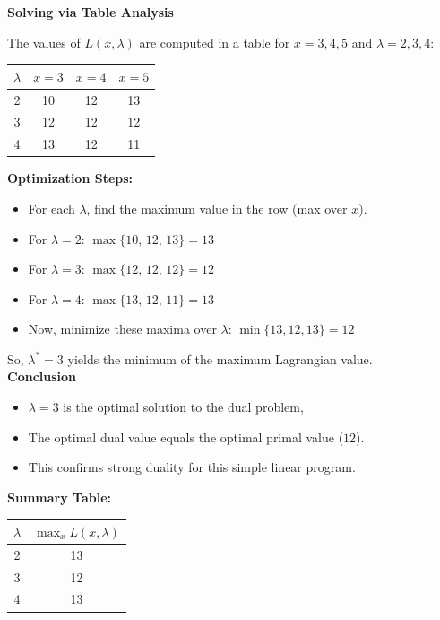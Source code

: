 \documentclass[12pt]{article}
\begin{document}
\textbf{Solving via Table Analysis}

The values of $L(x, \lambda)$ are computed in a table for $x = 3, 4, 5$ and $\lambda = 2, 3, 4$:

\begin{center}
\begin{tabular}{c|ccc}
$\lambda$ & $x = 3$ & $x = 4$ & $x = 5$ \\
\hline
2 & 10 & 12 & 13 \\
3 & 12 & 12 & 12 \\
4 & 13 & 12 & 11 \\
\end{tabular}
\end{center}

\vspace{1em}
\textbf{Optimization Steps:}
\begin{itemize}
    \item For each $\lambda$, find the maximum value in the row (max over $x$).
    \item For $\lambda = 2$: $\max \{10, \, 12, \, 13\} = 13$
    \item For $\lambda = 3$: $\max \{12, \, 12, \, 12\} = 12$
    \item For $\lambda = 4$: $\max \{13, \, 12, \, 11\} = 13$
    \item Now, minimize these maxima over $\lambda$: $\min \{13, 12, 13\} = 12$
\end{itemize}
So, $\lambda^* = 3$ yields the minimum of the maximum Lagrangian value. \\ 

\textbf{Conclusion}

\begin{itemize}
    \item $\lambda = 3$ is the optimal solution to the dual problem,
    \item The optimal dual value equals the optimal primal value ($12$).
    \item This confirms strong duality for this simple linear program.
\end{itemize}

\textbf{Summary Table:} \\ 

\begin{tabular}{|c|c|}
\hline
$\lambda$ & $\max_x L(x, \lambda)$ \\
\hline
2 & 13 \\
\hline
3 & 12 \\
\hline
4 & 13 \\
\hline
\end{tabular}
\end{document}
